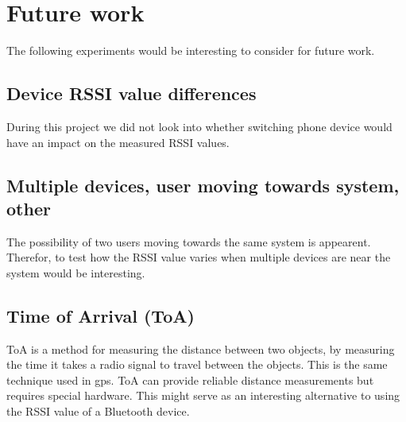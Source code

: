 \section{Future work}
The following experiments would be interesting to consider for future work.


\subsection{Device RSSI value differences}

During this project we did not look into whether switching phone device would have an impact on the measured RSSI values.


\subsection{Multiple devices, user moving towards system, other}

The possibility of two users moving towards the same system is appearent. Therefor, to test how the RSSI value varies when multiple devices are near the system would be interesting.


\subsection{Time of Arrival (ToA)}
ToA is a method for measuring the distance between two objects, by measuring the time it takes a radio signal to travel between the objects. This is the same technique used in gps. ToA can provide reliable distance measurements but requires special hardware. This might serve as an interesting alternative to using the RSSI value of a Bluetooth device.
